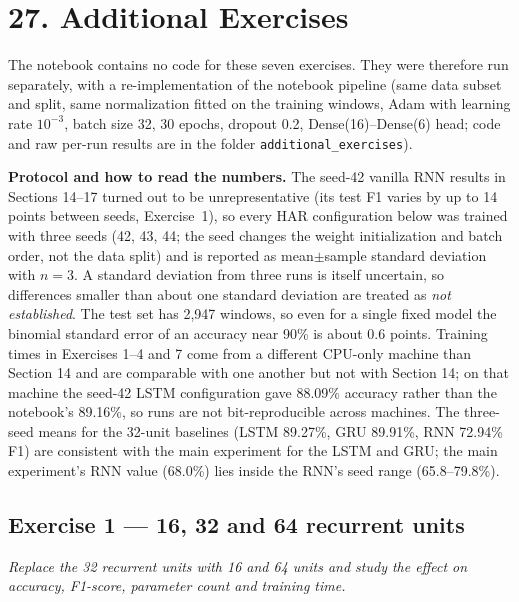 \documentclass[10pt]{article}
\begin{document}
\section*{27. Additional Exercises}

The notebook contains no code for these seven exercises. They were therefore run separately, with a re-implementation of the notebook pipeline (same data subset and split, same normalization fitted on the training windows, Adam with learning rate $10^{-3}$, batch size 32, 30 epochs, dropout 0.2, Dense(16)--Dense(6) head; code and raw per-run results are in the folder \texttt{additional\_exercises}).

\textbf{Protocol and how to read the numbers.} The seed-42 vanilla RNN results in Sections 14--17 turned out to be unrepresentative (its test F1 varies by up to 14 points between seeds, Exercise~1), so every HAR configuration below was trained with three seeds (42, 43, 44; the seed changes the weight initialization and batch order, not the data split) and is reported as mean$\pm$sample standard deviation with $n=3$. A standard deviation from three runs is itself uncertain, so differences smaller than about one standard deviation are treated as \emph{not established}. The test set has 2,947 windows, so even for a single fixed model the binomial standard error of an accuracy near 90\% is about 0.6 points. Training times in Exercises 1--4 and 7 come from a different CPU-only machine than Section 14 and are comparable with one another but not with Section 14; on that machine the seed-42 LSTM configuration gave 88.09\% accuracy rather than the notebook's 89.16\%, so runs are not bit-reproducible across machines. The three-seed means for the 32-unit baselines (LSTM 89.27\%, GRU 89.91\%, RNN 72.94\% F1) are consistent with the main experiment for the LSTM and GRU; the main experiment's RNN value (68.0\%) lies inside the RNN's seed range (65.8--79.8\%).

\subsection*{Exercise 1 --- 16, 32 and 64 recurrent units}
\textit{Replace the 32 recurrent units with 16 and 64 units and study the effect on accuracy, F1-score, parameter count and training time.}
\end{document}
